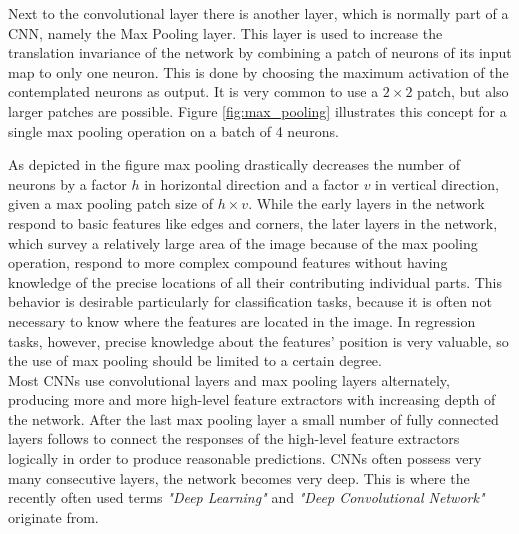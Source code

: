 \documentclass[11pt, a4paper]{article}
\newcommand\q[1]{\emph{"#1"}}
\begin{document}

Next to the convolutional layer there is another layer, which is normally part of a \ac{CNN}, namely the Max Pooling layer. This layer is used to increase the translation invariance of the network by combining a patch of neurons of its input map to only one neuron. This is done by choosing the maximum activation of the contemplated neurons as output. It is very common to use a $2\times2$ patch, but also larger patches are possible. Figure \ref{fig:max_pooling} illustrates this concept for a single max pooling operation on a batch of 4 neurons.

As depicted in the figure max pooling drastically decreases the number of neurons by a factor $h$ in horizontal direction and a factor $v$ in vertical direction, given a max pooling patch size of $h\times v$. While the early layers in the network respond to basic features like edges and corners, the later layers in the network, which survey a relatively large area of the image because of the max pooling operation, respond to more complex compound features without having knowledge of the precise locations of all their contributing individual parts. This behavior is desirable particularly for classification tasks, because it is often not necessary to know where the features are located in the image. In regression tasks, however, precise knowledge about the features' position is very valuable, so the use of max pooling should be limited to a certain degree.\\
Most \acp{CNN} use convolutional layers and max pooling layers alternately, producing more and more high-level feature extractors with increasing depth of the network. After the last max pooling layer a small number of fully connected layers follows to connect the responses of the high-level feature extractors logically in order to produce reasonable predictions. \acp{CNN} often possess very many consecutive layers, the network becomes very deep. This is where the recently often used terms \q{Deep Learning} and \q{Deep Convolutional Network} originate from. 

\newpage

\end{document}
